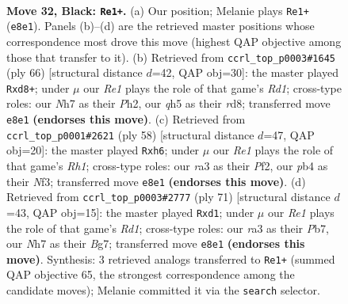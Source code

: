 \documentclass[11pt]{article}
\begin{document}
\clearpage

\begin{figure}[p]\centering
\begin{subfigure}{0.46\textwidth}\centering
\resizebox{\linewidth}{!}{%
\newchessgame
\chessboard[
  setfen={4r2k/p2p3n/2p2p2/7Q/1PPP4/R7/2q2P1P/6K1 b - - 1 32},
  showmover=false,
  pgfstyle=straightmove, color=movearrow, markmove={e8-e1}
]}
\caption{}
\end{subfigure}\hfill
\begin{subfigure}{0.46\textwidth}\centering
\resizebox{\linewidth}{!}{%
\newchessgame
\chessboard[
  setfen={3r2k1/1Q3p1p/6p1/1p2p3/4P2q/P7/1P4PP/3R3K w - - 2 34},
  showmover=false,
  pgfstyle=straightmove, color=movearrow, markmove={d1-d8}
]}
\caption{}
\end{subfigure}
\\[4pt]
\begin{subfigure}{0.46\textwidth}\centering
\resizebox{\linewidth}{!}{%
\newchessgame
\chessboard[
  setfen={3r2k1/5p2/1n2p2p/2q1P3/8/1Q3N2/1P3PP1/1K5R w - - 0 30},
  showmover=false,
  pgfstyle=straightmove, color=movearrow, markmove={h1-h6}
]}
\caption{}
\end{subfigure}\hfill
\begin{subfigure}{0.46\textwidth}\centering
\resizebox{\linewidth}{!}{%
\newchessgame
\chessboard[
  setfen={k2r4/1p3Qb1/2n4p/2p5/6p1/P7/KP4P1/3R4 b - - 0 36},
  showmover=false,
  pgfstyle=straightmove, color=movearrow, markmove={d8-d1}
]}
\caption{}
\end{subfigure}
\caption{\textbf{Move 32, Black: \texttt{Re1+}.} (a) Our position; Melanie plays \texttt{Re1+} (\texttt{e8e1}). Panels (b)--(d) are the retrieved master positions whose correspondence most drove this move (highest QAP objective among those that transfer to it). (b) Retrieved from \texttt{ccrl\_top\_p0003\#1645} (ply 66) [structural distance $d$=42, QAP obj=30]: the master played \texttt{Rxd8+}; under $\mu$ our \emph{Re1} plays the role of that game's \emph{Rd1}; cross-type roles: our \emph{N}h7 as their \emph{P}h2, our \emph{q}h5 as their \emph{r}d8; transferred move \texttt{e8e1} \textbf{(endorses this move)}. (c) Retrieved from \texttt{ccrl\_top\_p0001\#2621} (ply 58) [structural distance $d$=47, QAP obj=20]: the master played \texttt{Rxh6}; under $\mu$ our \emph{Re1} plays the role of that game's \emph{Rh1}; cross-type roles: our \emph{r}a3 as their \emph{P}f2, our \emph{p}b4 as their \emph{N}f3; transferred move \texttt{e8e1} \textbf{(endorses this move)}. (d) Retrieved from \texttt{ccrl\_top\_p0003\#2777} (ply 71) [structural distance $d$=43, QAP obj=15]: the master played \texttt{Rxd1}; under $\mu$ our \emph{Re1} plays the role of that game's \emph{Rd1}; cross-type roles: our \emph{r}a3 as their \emph{P}b7, our \emph{N}h7 as their \emph{B}g7; transferred move \texttt{e8e1} \textbf{(endorses this move)}. Synthesis: 3 retrieved analogs transferred to \texttt{Re1+} (summed QAP objective 65, the strongest correspondence among the candidate moves); Melanie committed it via the \texttt{search} selector.}
\label{fig:thought-m63}
\end{figure}
\end{document}
